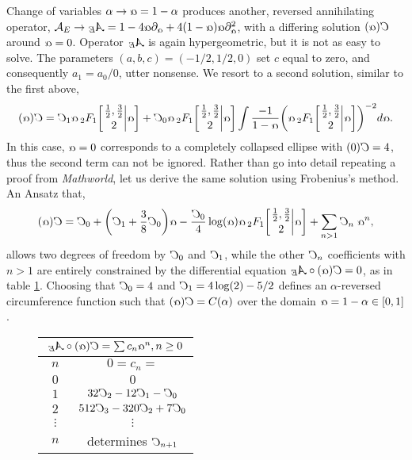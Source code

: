 \documentclass[nofootinbib,preprint]{revtex4-1}
\newcommand{\tFo}[3]{\,_2F_1 \bigg[ 
\genfrac.|{0pt}{}{#1}{#2} #3 \bigg]}
\newcommand{\rev}[1]{\text{\reflectbox{$#1$}}}
\begin{document}
Change of variables $\alpha \rightarrow \rev{\alpha} = 1-\alpha$ produces 
another, reversed annihilating operator, $\mathcal{A}_E \rightarrow \rev{\mathcal{A}_{E}} 
= 1-4\rev{\alpha} \partial_{\rev{\alpha}}
+4(1-\rev{\alpha})\rev{\alpha}\partial_{\rev{\alpha}}^2$,
with a differing solution $\rev{C(\alpha)}$ around $\rev{\alpha}=0$. 
Operator $\rev{\mathcal{A}_{E}}$ is again hypergeometric, but it is not as easy 
to solve. The parameters ${(a,b,c)=(-1/2,1/2,0)}$ set $c$ equal to zero, and consequently 
$a_1 = a_0/0$, utter nonsense. We resort to a second solution, similar to the first above,
\begin{eqnarray}
\rev{C(\alpha)}
 = \rev{C}_1 \rev{\alpha} \tFo{\frac{1}{2},\frac{3}{2}}{2}{\rev{\alpha}}
+ \rev{C}_0 \rev{\alpha} \tFo{\frac{1}{2},\frac{3}{2}}{2}{\rev{\alpha}}
\int \frac{-1}{1-\rev{\alpha}}
\bigg(\rev{\alpha} \tFo{\frac{1}{2},\frac{3}{2}}{2}{\rev{\alpha}}\bigg)^{-2}d\rev{\alpha}
 .  \nonumber 
\end{eqnarray}
In this case, $\rev{\alpha}=0$ corresponds to a completely collapsed ellipse with 
$\rev{C(0)}=4$, thus the second term can not be ignored. Rather than go into detail 
repeating a proof from \textit{Mathworld}, let us derive the same solution using 
Frobenius's method. An Ansatz that,
\begin{eqnarray}
\rev{C(\alpha)} = \rev{C}_0 
+ \bigg(\rev{C}_1+\frac{3}{8}\rev{C}_0\bigg) \rev{\alpha} 
-\frac{\rev{C}_0}{4}\log(\rev{\alpha}) \rev{\alpha} 
\tFo{\frac{1}{2},\frac{3}{2}}{2}{\rev{\alpha}}
+ \sum_{n>1}\rev{C}_n\;\rev{\alpha}^n , \nonumber  
\end{eqnarray}
allows two degrees of freedom by $\rev{C}_0$ and $\rev{C}_1$, while 
the other $\rev{C}_n$ coefficients with $n>1$ are entirely constrained by the 
differential equation $\rev{\mathcal{A}_{E}} \circ \rev{C(\alpha)}=0$,
as in table \ref{tab:ConsC}. Choosing that $\rev{C}_0 = 4$ 
and $\rev{C}_1 = 4\log(2)-5/2$ 
defines an $\alpha$-reversed circumference function such that 
$\rev{C(\alpha)}=C(\alpha)$ over the domain $\rev{\alpha} = 1-\alpha \in [0,1]$.

\begin{wrapfigure}{R}{7cm}
\begin{center}
\begin{tabular}{ c | c }
\hline \hline
\multicolumn{2}{c}{
\;\;\;$\rev{\mathcal{A}_E} \circ \rev{C(\alpha)}
= \sum c_n \rev{\alpha}^n, n\ge 0$\;\;\; } \\
\hline 
$\;\;n\;\;$& $0=c_n=$ \\
\hline
$0$ & $0$  \\
$1$ & $32 \rev{C}_2-12\rev{C}_1-\rev{C}_0$  \\
$2$ & $512 \rev{C}_3-320\rev{C}_2+7\rev{C}_0$  \\
$\vdots$ & $\vdots$  \\
$n$ & determines $\rev{C}_{n+1}$  
\label{tab:ConsC}
\end{tabular}
\end{center}
\end{wrapfigure}
\end{document}
